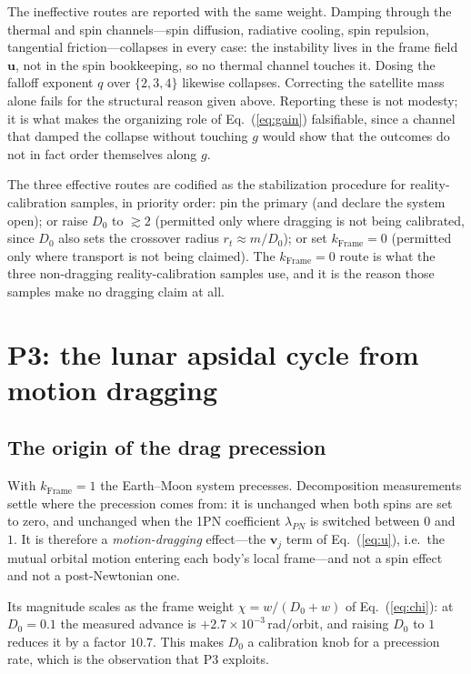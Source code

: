 \documentclass[aps,reprint,amsmath,amssymb,nofootinbib,superscriptaddress,floatfix]{revtex4-2}
\begin{document}
The ineffective routes are reported with the same weight.
Damping through the thermal and spin channels---spin diffusion,
radiative cooling, spin repulsion, tangential friction---collapses in
every case: the instability lives in the frame field $\bm u$, not in
the spin bookkeeping, so no thermal channel touches it.
Dosing the falloff exponent $q$ over $\{2,3,4\}$ likewise collapses.
Correcting the satellite mass alone fails for the structural reason
given above.
Reporting these is not modesty; it is what makes the organizing role of
Eq.~(\ref{eq:gain}) falsifiable, since a channel that damped the
collapse without touching $g$ would show that the outcomes do not in
fact order themselves along $g$.

The three effective routes are codified as the stabilization procedure
for reality-calibration samples, in priority order: pin the primary
(and declare the system open); or raise $D_0$ to $\gtrsim2$ (permitted
only where dragging is not being calibrated, since $D_0$ also sets the
crossover radius $r_t\approx m/D_0$); or set $k_{\mathrm{Frame}}=0$
(permitted only where transport is not being claimed).
The $k_{\mathrm{Frame}}=0$ route is what the three non-dragging
reality-calibration samples use, and it is the reason those samples
make no dragging claim at all.

\section{P3: the lunar apsidal cycle from motion dragging}
\label{sec:p3}

\subsection{The origin of the drag precession}
\label{sec:p3origin}

With $k_{\mathrm{Frame}}=1$ the Earth--Moon system precesses.
Decomposition measurements settle where the precession comes from:
it is unchanged when both spins are set to zero, and unchanged when
the 1PN coefficient $\lambda_{PN}$ is switched between $0$ and $1$.
It is therefore a \emph{motion-dragging} effect---the $\bm v_j$ term of
Eq.~(\ref{eq:u}), i.e.\ the mutual orbital motion entering each body's
local frame---and not a spin effect and not a post-Newtonian one.

Its magnitude scales as the frame weight $\chi=w/(D_0+w)$ of
Eq.~(\ref{eq:chi}): at $D_0=0.1$ the measured advance is
$+2.7\times10^{-3}$\,rad/orbit, and raising $D_0$ to $1$ reduces it by
a factor $10.7$.
This makes $D_0$ a calibration knob for a precession rate, which is the
observation that P3 exploits.
\end{document}
